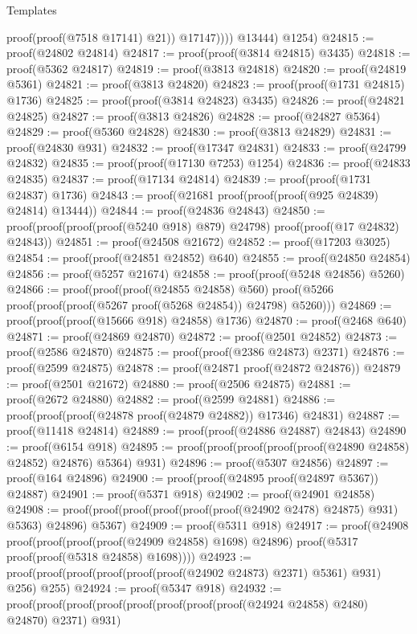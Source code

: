 \begin{lexlean}{Templates}
\begin{coremodule}
                    proof(proof(@7518 @17141) @21))
                  @17147))))
        @13444)
      @1254)
@24815 := proof(@24802 @24814)
@24817 := proof(proof(@3814 @24815) @3435)
@24818 := proof(@5362 @24817)
@24819 := proof(@3813 @24818)
@24820 := proof(@24819 @5361)
@24821 := proof(@3813 @24820)
@24823 := proof(proof(@1731 @24815) @1736)
@24825 := proof(proof(@3814 @24823) @3435)
@24826 := proof(@24821 @24825)
@24827 := proof(@3813 @24826)
@24828 := proof(@24827 @5364)
@24829 := proof(@5360 @24828)
@24830 := proof(@3813 @24829)
@24831 := proof(@24830 @931)
@24832 := proof(@17347 @24831)
@24833 := proof(@24799 @24832)
@24835 := proof(proof(@17130 @7253) @1254)
@24836 := proof(@24833 @24835)
@24837 := proof(@17134 @24814)
@24839 := proof(proof(@1731 @24837) @1736)
@24843 := proof(@21681 proof(proof(proof(@925 @24839) @24814) @13444))
@24844 := proof(@24836 @24843)
@24850 := proof(proof(proof(proof(@5240 @918) @879) @24798) proof(proof(@17 @24832) @24843))
@24851 := proof(@24508 @21672)
@24852 := proof(@17203 @3025)
@24854 := proof(proof(@24851 @24852) @640)
@24855 := proof(@24850 @24854)
@24856 := proof(@5257 @21674)
@24858 := proof(proof(@5248 @24856) @5260)
@24866 := proof(proof(proof(@24855 @24858) @560)
      proof(@5266 proof(proof(proof(@5267 proof(@5268 @24854)) @24798) @5260)))
@24869 := proof(proof(proof(@15666 @918) @24858) @1736)
@24870 := proof(@2468 @640)
@24871 := proof(@24869 @24870)
@24872 := proof(@2501 @24852)
@24873 := proof(@2586 @24870)
@24875 := proof(proof(@2386 @24873) @2371)
@24876 := proof(@2599 @24875)
@24878 := proof(@24871 proof(@24872 @24876))
@24879 := proof(@2501 @21672)
@24880 := proof(@2506 @24875)
@24881 := proof(@2672 @24880)
@24882 := proof(@2599 @24881)
@24886 := proof(proof(proof(@24878 proof(@24879 @24882)) @17346) @24831)
@24887 := proof(@11418 @24814)
@24889 := proof(proof(@24886 @24887) @24843)
@24890 := proof(@6154 @918)
@24895 := proof(proof(proof(proof(proof(@24890 @24858) @24852) @24876) @5364) @931)
@24896 := proof(@5307 @24856)
@24897 := proof(@164 @24896)
@24900 := proof(proof(@24895 proof(@24897 @5367)) @24887)
@24901 := proof(@5371 @918)
@24902 := proof(@24901 @24858)
@24908 := proof(proof(proof(proof(proof(proof(@24902 @2478) @24875) @931) @5363) @24896) @5367)
@24909 := proof(@5311 @918)
@24917 := proof(@24908
      proof(proof(proof(proof(@24909 @24858) @1698) @24896)
          proof(@5317 proof(proof(@5318 @24858) @1698))))
@24923 := proof(proof(proof(proof(proof(proof(@24902 @24873) @2371) @5361) @931) @256) @255)
@24924 := proof(@5347 @918)
@24932 := proof(proof(proof(proof(proof(proof(proof(proof(@24924 @24858) @2480) @24870) @2371) @931)

\end{coremodule}
\end{lexlean}
